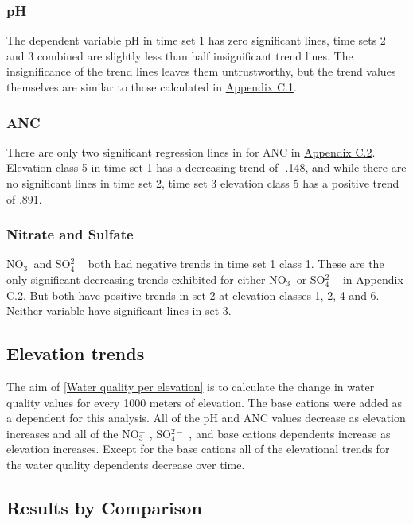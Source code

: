 \subsubsection{pH}

The dependent variable pH in time set 1 has zero significant lines, time sets 2 and 3 combined are slightly less than half insignificant trend lines. 
The insignificance of the trend lines leaves them untrustworthy, but the trend values themselves are similar to those calculated in \hyperref[sec:SWJD]{Appendix C.1}.

\subsubsection{ANC}

There are only two significant regression lines in for ANC in  \hyperref[sec:TVJD]{Appendix C.2}. 
Elevation class 5 in time set 1 has a decreasing trend of -.148,  and while there are no significant lines in time set 2, time set 3 elevation class 5 has a positive trend of .891.

\subsubsection{Nitrate and Sulfate}

NO$_3^-$ and SO$_4^{2-}$ both had negative trends in time set 1 class 1. 
These are the only significant decreasing trends exhibited for either NO$_3^-$ or SO$_4^{2-}$  in  \hyperref[sec:TVJD]{Appendix C.2}.  
But both have positive trends in set 2 at elevation classes 1, 2, 4 and 6.
Neither variable have significant lines in set 3.

\subsection{Elevation trends}

The aim of \autoref{Water quality per elevation} is to calculate the change in water quality values for every 1000 meters of elevation.  
The base cations were added as a dependent for this analysis. 
All of the pH and ANC values decrease as elevation increases and all of the  NO$_3^-$ , SO$_4^{2-}$ , and base cations dependents increase as elevation increases. 
Except for the base cations all of the elevational trends for the water quality dependents decrease over time.

\subsection{Results by Comparison}

